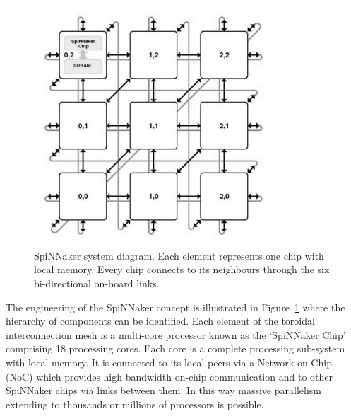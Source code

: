 \begin{figure}
	\centering
	\includegraphics[width=0.8\textwidth]{pics/mesh_ctiff.jpg}
	\caption{SpiNNaker system diagram.
		Each element represents one chip with local memory.
		Every chip connects to its neighbours through the six bi-directional on-board links. }
	\label{fig:sysdia}
\end{figure}

The engineering of the SpiNNaker concept is illustrated in Figure~\ref{fig:sysdia} where the hierarchy of components can be identified. 
Each element of the toroidal interconnection mesh is a multi-core processor known as the `SpiNNaker Chip' comprising 18 processing cores. 
Each core is a complete processing sub-system with local memory.
It is connected to its local peers via a Network-on-Chip (NoC) which provides high bandwidth on-chip communication and to other SpiNNaker chips via links between them. 
In this way massive parallelism extending to thousands or millions of processors is possible.



%

